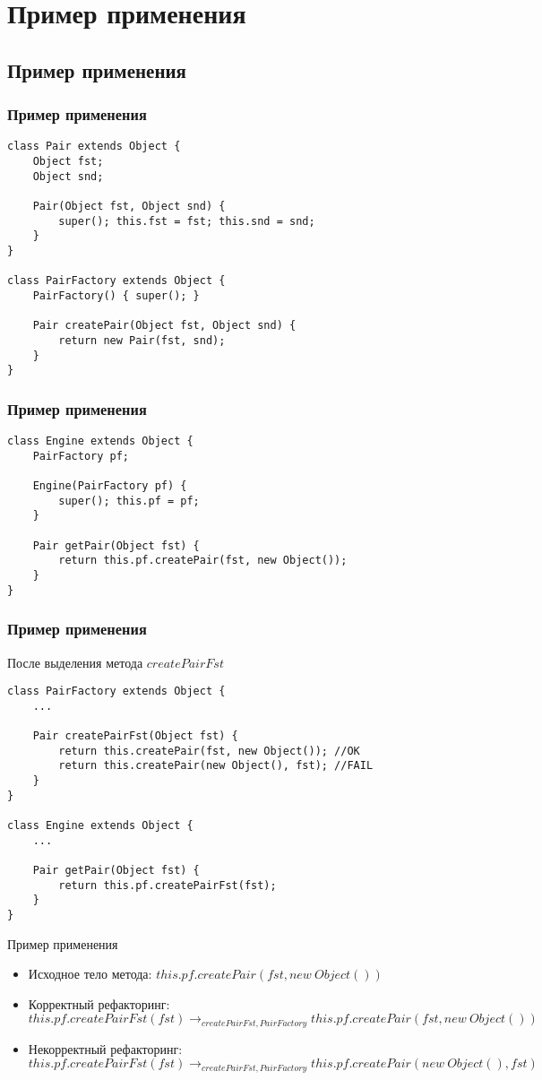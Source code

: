 \documentclass[hyperref=unicode,graphics=pdflatex,13pt]{beamer}
\begin{document}
\section{Пример применения}
\subsection{Пример применения}
\begin{frame}[fragile]
\frametitle{Пример применения}
\begin{lstlisting}
class Pair extends Object {
    Object fst;
    Object snd;
    
    Pair(Object fst, Object snd) {
        super(); this.fst = fst; this.snd = snd;
    }
}

class PairFactory extends Object {
    PairFactory() { super(); }

    Pair createPair(Object fst, Object snd) {
        return new Pair(fst, snd);
    }
}
\end{lstlisting}
\end{frame}

\begin{frame}[fragile]
\frametitle{Пример применения}
\begin{lstlisting}
class Engine extends Object {
    PairFactory pf;

    Engine(PairFactory pf) {
        super(); this.pf = pf;
    }
    
    Pair getPair(Object fst) {
        return this.pf.createPair(fst, new Object());
    }
}
\end{lstlisting}
\end{frame}

\begin{frame}[fragile]
\frametitle{Пример применения}
После выделения метода $createPairFst$
\begin{lstlisting}
class PairFactory extends Object {
    ...

    Pair createPairFst(Object fst) {
        return this.createPair(fst, new Object()); //OK
        return this.createPair(new Object(), fst); //FAIL
    }
}

class Engine extends Object {
    ...

    Pair getPair(Object fst) {
        return this.pf.createPairFst(fst);
    }
}
\end{lstlisting}
\end{frame}

\begin{frame}{Пример применения}
\begin{itemize}
    \item Исходное тело метода:
    $this.pf.createPair(fst, new\ Object())$
    \item Корректный рефакторинг:
    $this.pf.createPairFst(fst) \rightarrow_{createPairFst,PairFactory} 
    this.pf.createPair(fst, new\ Object())$
    \item Некорректный рефакторинг:
    $this.pf.createPairFst(fst) \rightarrow_{createPairFst,PairFactory} 
    this.pf.createPair(new\ Object(), fst)$
\end{itemize}
\end{frame}
\end{document}
